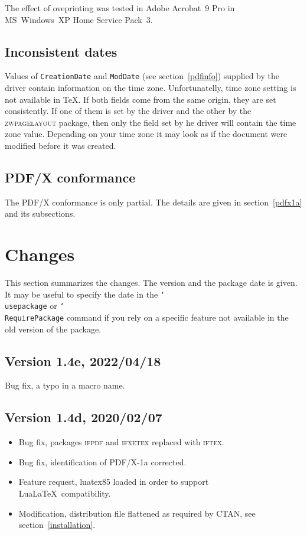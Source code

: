 \documentclass[11pt]{article}
\let\pkg\textsc
\DeclareRobustCommand\cmd[1]{\texttt{\char`\\#1}}
\begin{document}
The effect of oveprinting was tested in Adobe Acrobat~9 Pro in MS~Windows~XP Home Service Pack~3.

\subsection{Inconsistent dates}
Values of \texttt{CreationDate} and \texttt{ModDate} (see section~\ref{pdfinfo}) supplied by the driver contain information on
the time zone. Unfortunatelly, time zone setting is not available in \TeX. If both fields come from
the same origin, they are set consistently. If one of them is set by the driver and the other by
the \pkg{zwpagelayout} package, then only the field set by he driver will contain the time zone
value. Depending on your time zone it may look as if the document were modified before it was
created.

\subsection{PDF/X conformance}
The PDF/X conformance is only partial. The details are given in section~\ref{pdfx1a} and its
subsections.

\section{Changes}
This section summarizes the changes. The version and the package date is given. It may be useful to
specify the date in the \cmd{usepackage} or \cmd{RequirePackage} command if you rely on a specific
feature not available in the old version of the package.

\subsection{Version 1.4e, 2022/04/18}
Bug fix, a typo in a macro name.

\subsection{Version 1.4d, 2020/02/07}
\begin{itemize}
\item Bug fix, packages \pkg{ifpdf} and \pkg{ifxetex} replaced with \pkg{iftex}.
\item Bug fix, identification of PDF/X-1a corrected.
\item Feature request, luatex85 loaded in order to support Lua\LaTeX\ compatibility.
\item Modification, distribution file flattened as required by CTAN, see
section~\ref{installation}.
\end{itemize}
\end{document}
